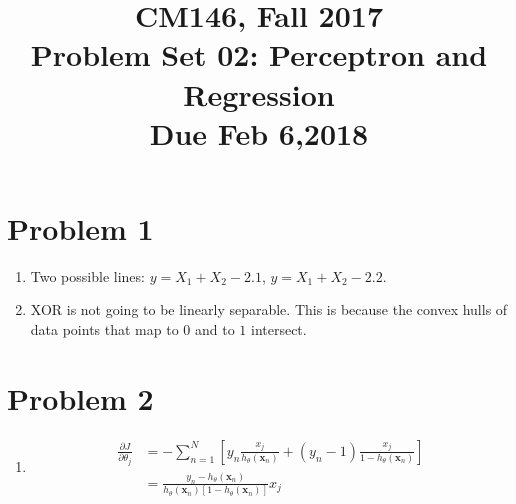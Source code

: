 \documentclass[11pt]{article}
\newcommand{\cnum}{CM146}
\newcommand{\ced}{Fall 2017}
\newcommand{\ctitle}[3]{\title{\vspace{-0.5in}\cnum, \ced\\Problem Set #1: #2\\Due #3}}
\begin{document}
\ctitle{02}{Perceptron and Regression}{Feb 6,2018}
\author{}
\date{}
\maketitle
\vspace{-0.75in}

\section{Problem 1}
\begin{enumerate}
\item Two possible lines: $y = X_1 + X_2 - 2.1$,
  $y = X_1 + X_2 - 2.2$.
  \vspace{10}
\item XOR is not going to be linearly separable. This is because the convex
  hulls of data points that map to $0$ and to $1$ intersect.
\end{enumerate}

\newpage
\section{Problem 2}

\begin{enumerate}
\item
  \begin{align*}
    \frac{\partial J}{\partial \theta_j}
    &=
    -\sum_{n=1}^N \left[y_n \frac{x_j}{h_{\theta}(\textbf{x}_n)}
      + (y_n-1)\frac{x_j}{1-h_{\theta}(\textbf{x}_n)}\right]\\
    &= \frac{y_n - h_\theta(\textbf{x}_n)}{h_\theta (\textbf{x}_n) [1 - h_\theta(\textbf{x}_n)]}x_j
  \end{align*}
\end{enumerate}
\newpage
\end{document}
